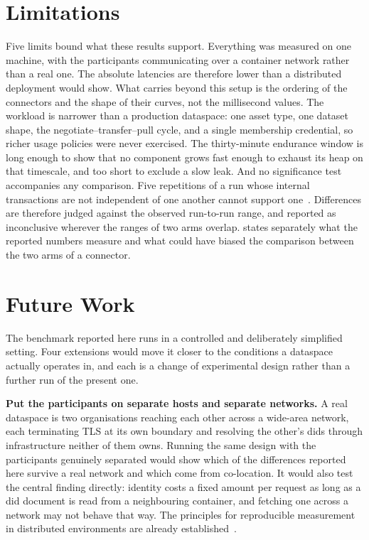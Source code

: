 \section{Limitations}\label{sec:conclusion-limitations}

Five limits bound what these results support. Everything was measured on one machine, with
the participants communicating over a container network rather than a real one. The
absolute latencies are therefore lower than a distributed deployment would show. What
carries beyond this setup is the ordering of the connectors and the shape of their curves,
not the millisecond values. The workload is narrower than a production dataspace: one asset type,
one dataset shape, the negotiate--transfer--pull cycle, and a single membership credential,
so richer usage policies were never exercised. The
thirty-minute endurance window is long enough to show that no component grows fast enough to
exhaust its heap on that timescale, and too short to exclude a slow leak. And no
significance test accompanies any comparison. Five repetitions of a run whose internal
transactions are not independent of one another cannot support
one~\citep{hoefler2015scientific}. Differences are therefore judged against the observed
run-to-run range, and reported as inconclusive wherever the ranges of two arms overlap.
 states separately what the reported numbers measure and what
could have biased the comparison between the two arms of a connector.


\section{Future Work}\label{sec:future-work}

The benchmark reported here runs in a controlled and deliberately simplified setting. Four
extensions would move it closer to the conditions a dataspace actually operates in, and each
is a change of experimental design rather than a further run of the present one.

\textbf{Put the participants on separate hosts and separate networks.} A real dataspace is
two organisations reaching each other across a wide-area network, each terminating TLS at its
own boundary and resolving the other's \glspl{did} through infrastructure neither of them
owns. Running the same design with the participants genuinely separated would show which of
the differences reported here survive a real network and which come from co-location. It
would also test the central finding directly: identity costs a fixed amount per request as
long as a \gls{did} document is read from a neighbouring container, and fetching one across a
network may not behave that way. The principles for reproducible measurement in distributed
environments are already established~\citep{papadopoulos2021reproducible}.

